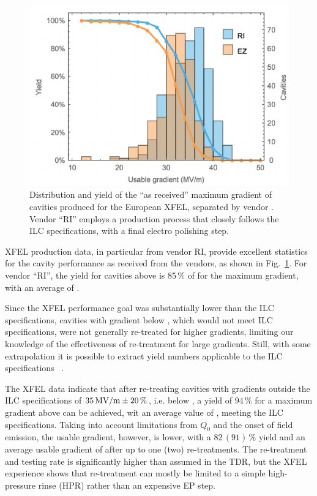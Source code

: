 \begin{figure}[htbp]
   \includegraphics[width=\hsize]{chapters/figures/prab-20-042004-fig33}
\caption{Distribution and yield of the ``as received'' maximum
gradient of cavities produced for the European XFEL, separated by vendor \cite[Fig. 33]{Reschke:2017gjp}. 
Vendor ``RI'' employs a production process that closely follows the ILC specifications, with a final electro polishing step.}
\label{fig:cavity-yield}
\end{figure}


XFEL production data, in particular from vendor RI, provide excellent statistics for the cavity performance as received from the vendors, as shown in Fig.~\ref{fig:cavity-yield}.
For vendor ``RI'', the yield for cavities above  is $85\,\%$ of for the maximum gradient, with an average of .

Since the XFEL performance goal was substantially lower than the ILC specifications, cavities with gradient below , which would not meet ILC specifications, were not generally re-treated for higher gradients, limiting our knowledge of the effectiveness of re-treatment for large gradients.
Still, with some extrapolation it is possible to extract yield numbers applicable to the ILC specifications ~\cite{bib:Walker:2017.lcws}.

The XFEL data indicate that after re-treating cavities with gradients outside the ILC specifications of $35\,{\mathrm{MV/m}} \pm 20\,\%$, i.e. below , a yield of $94\,\%$ for a maximum gradient above  can be achieved, wit an average value of , meeting the ILC specifications.
Taking into account limitations from $Q_0$ and the onset of field emission, the usable gradient, however, is lower, with a $82\,(91)\,\%$ yield and an average usable gradient of  after up to one (two) re-treatments.
The re-treatment and testing rate is significantly higher than assumed in the TDR, but the XFEL experience shows that re-treatment can mostly be limited to a simple high-pressure rinse (HPR) rather than an expensive EP step.  

